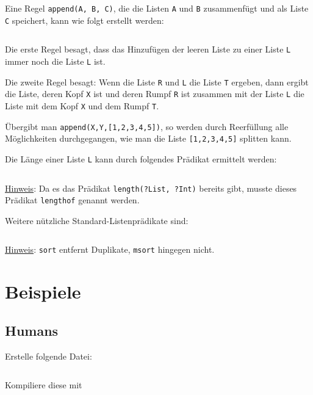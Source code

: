 \inputminted[numbersep=5pt, tabsize=4]{prolog}{scripts/prolog/liste-member.pl}

Eine Regel \texttt{append(A, B, C)}, die die Listen \texttt{A} und \texttt{B} 
zusammenfügt und als Liste \texttt{C} speichert, kann
wie folgt erstellt werden:

\inputminted[numbersep=5pt, tabsize=4]{prolog}{scripts/prolog/liste-append.pl}

Die erste Regel besagt, dass das Hinzufügen der leeren Liste zu einer Liste 
\texttt{L} immer noch die Liste \texttt{L} ist.

Die zweite Regel besagt: Wenn die Liste \texttt{R} und \texttt{L} die Liste \texttt{T}
ergeben, dann ergibt die Liste, deren Kopf \texttt{X} ist und deren Rumpf \texttt{R}
ist zusammen mit der Liste \texttt{L} die Liste mit dem Kopf \texttt{X} und dem
Rumpf \texttt{T}.

Übergibt man \texttt{append(X,Y,[1,2,3,4,5])}, so werden durch Reerfüllung alle
Möglichkeiten durchgegangen, wie man die Liste \texttt{[1,2,3,4,5]} splitten kann.

Die Länge einer Liste \texttt{L} kann durch folgendes Prädikat ermittelt werden:%

\inputminted[numbersep=5pt, tabsize=4]{prolog}{scripts/prolog/list-length.pl}

\underline{Hinweis}: Da es das Prädikat \texttt{length(?List, ?Int)} bereits gibt, 
musste dieses Prädikat \texttt{lengthof} genannt werden.

Weitere nützliche Standard-Listenprädikate sind:
\inputminted[numbersep=5pt, tabsize=4]{prolog}{scripts/prolog/standard-list-predicates.pl}

\underline{Hinweis}: \texttt{sort} entfernt Duplikate, \texttt{msort} hingegen nicht.

\section{Beispiele}
\subsection{Humans}
Erstelle folgende Datei:
\inputminted[linenos, numbersep=5pt, tabsize=4, frame=lines, label=human.pro]{prolog}{scripts/prolog/human.pro}

Kompiliere diese mit
\inputminted[numbersep=5pt, tabsize=4]{bash}{scripts/prolog/human.sh}

